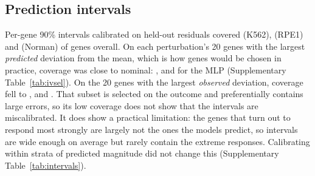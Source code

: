 \subsection{Prediction intervals}
Per-gene 90\% intervals calibrated on held-out residuals covered \numCovReplogleKEssential{} (K562), \numCovReplogleRpe{} (RPE1) and \numCovNorman{} (Norman) of genes overall. On each perturbation's 20 genes with the largest \emph{predicted} deviation from the mean, which is how genes would be chosen in practice, coverage was close to nominal: \numIvPredReplogleKEssentialMlpEnsemble{}, \numIvPredReplogleRpeMlpEnsemble{} and \numIvPredNormanMlpEnsemble{} for the MLP (Supplementary Table~\ref{tab:ivsel}). On the 20 genes with the largest \emph{observed} deviation, coverage fell to \numCovTopReplogleKEssential, \numCovTopReplogleRpe{} and \numCovTopNorman. That subset is selected on the outcome and preferentially contains large errors, so its low coverage does not show that the intervals are miscalibrated. It does show a practical limitation: the genes that turn out to respond most strongly are largely not the ones the models predict, so intervals are wide enough on average but rarely contain the extreme responses. Calibrating within strata of predicted magnitude did not change this (Supplementary Table~\ref{tab:intervals}).
